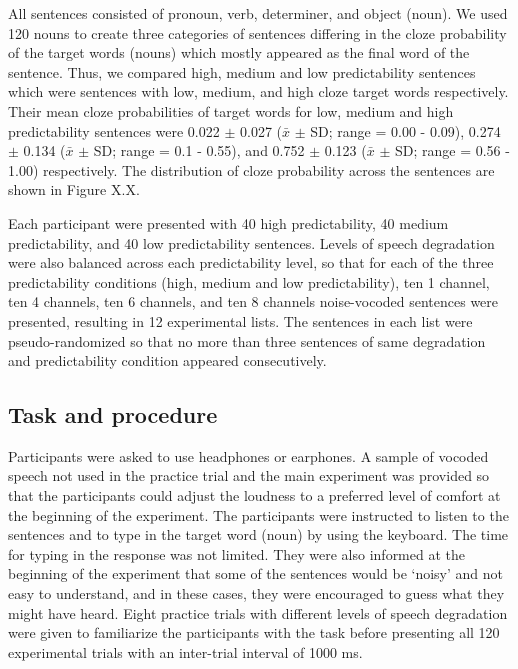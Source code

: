 \documentclass[a4paper, nobind]{templates/ociamthesis}
\begin{document}
All sentences consisted of pronoun, verb, determiner, and object (noun).
We used 120 nouns to create three categories of sentences differing in the cloze probability of the target words (nouns) which mostly appeared as the final word of the sentence.
Thus, we compared high, medium and low predictability sentences which were sentences with low, medium, and high cloze target words respectively.
Their mean cloze probabilities of target words for low, medium and high predictability sentences were 0.022 \(\pm\) 0.027 (\(\bar{x}\) \(\pm\) SD; range = 0.00 - 0.09), 0.274 \(\pm\) 0.134 (\(\bar{x}\) \(\pm\) SD; range = 0.1 - 0.55), and 0.752 \(\pm\) 0.123 (\(\bar{x}\) \(\pm\) SD; range = 0.56 - 1.00) respectively.
The distribution of cloze probability across the sentences are shown in Figure X.X.

Each participant were presented with 40 high predictability, 40 medium predictability, and 40 low predictability sentences.
Levels of speech degradation were also balanced across each predictability level, so that for each of the three predictability conditions (high, medium and low predictability), ten 1 channel, ten 4 channels, ten 6 channels, and ten 8 channels noise-vocoded sentences were presented, resulting in 12 experimental lists.
The sentences in each list were pseudo-randomized so that no more than three sentences of same degradation and predictability condition appeared consecutively.

\hypertarget{task-and-procedure}{%
\subsection{Task and procedure}\label{task-and-procedure}}

Participants were asked to use headphones or earphones.
A sample of vocoded speech not used in the practice trial and the main experiment was provided so that the participants could adjust the loudness to a preferred level of comfort at the beginning of the experiment.
The participants were instructed to listen to the sentences and to type in the target word (noun) by using the keyboard.
The time for typing in the response was not limited.
They were also informed at the beginning of the experiment that some of the sentences would be `noisy' and not easy to understand, and in these cases, they were encouraged to guess what they might have heard.
Eight practice trials with different levels of speech degradation were given to familiarize the participants with the task before presenting all 120 experimental trials with an inter-trial interval of 1000 ms.
\end{document}
